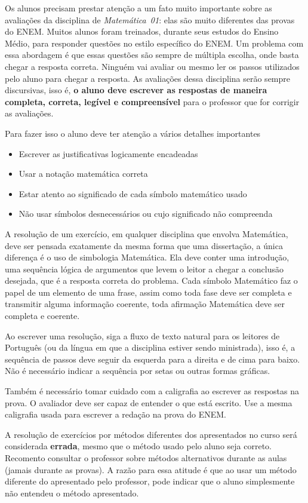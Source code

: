 Os alunos precisam prestar atenção a um fato muito importante sobre as avaliações da disciplina de \emph{Matemática~01}:
elas são muito diferentes das provas do ENEM.
Muitos alunos foram treinados, durante seus estudos do Ensino Médio, para responder questões
no estilo específico do ENEM. Um problema com essa abordagem é que essas questões são
sempre de múltipla escolha, onde basta chegar a resposta correta. Ninguém
vai avaliar ou mesmo ler os passos utilizados pelo aluno para chegar a resposta.
As avaliações dessa disciplina serão sempre discursivas, isso é, \textbf{o aluno deve escrever
as respostas de maneira completa, correta, legível e compreensível} para o professor que
for corrigir as avaliações.

Para fazer isso o aluno deve ter atenção a vários detalhes importantes
\begin{itemize}
    \item Escrever as justificativas logicamente encadeadas
    \item Usar a notação matemática correta
    \item Estar atento ao significado de cada símbolo matemático usado
    \item Não usar símbolos desnecessários ou cujo significado não compreenda
\end{itemize}

A resolução de um exercício, em qualquer disciplina que envolva Matemática, deve ser pensada exatamente da mesma forma
que uma dissertação, a única diferença é o uso de simbologia Matemática. Ela deve conter uma introdução,
uma sequência lógica de argumentos que levem o leitor a chegar a conclusão desejada, que é a resposta correta
do problema. Cada símbolo Matemático faz o papel de um elemento de uma frase, assim como toda fase deve
ser completa e transmitir alguma informação coerente, toda afirmação Matemática deve ser completa e coerente.

Ao escrever uma resolução, siga a fluxo de texto natural para os leitores de Português (ou da língua em que a disciplina
estiver sendo ministrada), isso é, a sequência de passos deve seguir da esquerda para a direita e de cima para baixo.
Não é necessário indicar a sequência por setas ou outras formas gráficas.

Também é necessário tomar cuidado com a caligrafia ao escrever as respostas na prova. O avaliador deve ser capaz
de entender o que está escrito. Use a mesma caligrafia usada para escrever a redação na prova do ENEM.

A resolução de exercícios por métodos diferentes dos apresentados no curso será considerada \textbf{errada},
mesmo que o método usado pelo aluno seja correto. Recomento consultar o professor sobre métodos
alternativos durante as aulas (jamais durante as provas). A razão para essa atitude é que
ao usar um método diferente do apresentado pelo professor, pode indicar que o aluno simplesmente
não entendeu o método apresentado.


